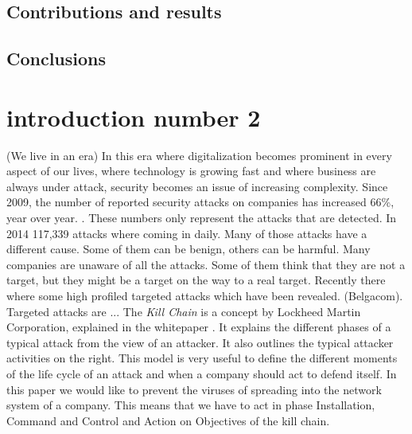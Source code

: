 \subsection{Contributions and results}
\subsection{Conclusions}


\section{introduction number 2}

(We live in an era) In this era where digitalization becomes prominent in every aspect of our lives, where technology is growing fast and where business are always under attack, security becomes an issue of increasing complexity. Since 2009, the number of reported security attacks on companies has increased 66\%, year over year. . These numbers only represent the attacks that are detected. In 2014 117,339 attacks where coming in daily. Many of those attacks have a different cause. Some of them can be benign, others can be harmful. Many companies are unaware of all the attacks. Some of them think that they are not a target, but they might be a target on the way to a real target. Recently there where some high profiled targeted attacks which have been revealed. (Belgacom). 
Targeted attacks are ...
The \textit{Kill Chain} is a concept by Lockheed Martin Corporation, explained in the whitepaper . It explains the different phases of a typical attack from the view of an attacker. It also outlines the typical attacker activities on the right. This model is very useful to define the different moments of the life cycle of an attack and when a company should act to defend itself. In this paper we would like to prevent the viruses of spreading into the network system of a company. This means that we have to act in phase Installation, Command and Control and Action on Objectives of the kill chain. 

